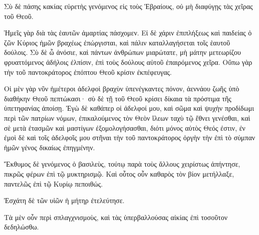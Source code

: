 {Σὺ δὲ πάσης κακίας εὑρετὴς γενόμενος εἰς τοὺς Ἑβραίους, οὐ μὴ διαφύγῃς τὰς χεῖρας τοῦ Θεοῦ.
\par }{\PP {}Ἡμεῖς γὰρ διὰ τὰς ἑαυτῶν ἁμαρτίας πάσχομεν.
Εἰ δὲ χάριν ἐπιπλήξεως καὶ παιδείας ὁ ζῶν Κύριος ἡμῶν βραχέως ἐπώργισται, καὶ πάλιν καταλλαγήσεται τοῖς ἑαυτοῦ δούλοις.
Σὺ δὲ ὦ ἀνόσιε, καὶ πάντων ἀνθρώπων μιαρώτατε, μὴ μάτην μετεωρίζου φρυαττόμενος ἀδήλοις ἐλπίσιν, ἐπὶ τοὺς δούλους αὐτοῦ ἐπαιρόμενος χεῖρα.
Οὔπω γὰρ τὴν τοῦ παντοκράτορος ἐπόπτου Θεοῦ κρίσιν ἐκπέφευγας.
\par }{\PP {}Οἱ μὲν γὰρ νῦν ἡμέτεροι ἀδελφοὶ βραχὺν ὑπενέγκαντες πόνον, ἀεννάου ζωῆς ὑπὸ διαθήκην Θεοῦ πεπτώκασι· σὺ δὲ τῇ τοῦ Θεοῦ κρίσει δίκαια τὰ πρόστιμα τῆς ὑπετηφανίας ἀποίσῃ.
Ἐγὼ δὲ καθάπερ οἱ ἀδελφοί μου, καὶ σῶμα καὶ ψυχὴν προδίδωμι περὶ τῶν πατρίων νόμων, ἐπικαλούμενος τὸν Θεὸν ἵλεων ταχὺ τῷ ἔθνει γενέσθαι, καὶ σὲ μετὰ ἐτασμῶν καὶ μαστίγων ἐξομολογήσασθαι, διότι μόνος αὐτὸς Θεός ἐστιν,
ἐν ἐμοὶ δὲ καὶ τοῖς ἀδελφοῖς μου στῆναι τὴν τοῦ παντοκράτορος ὀργὴν τὴν ἐπὶ τὸ σύμπαν ἡμῶν γένος δικαίως ἐπηγμένην.
\par }{\PP {}Ἔκθυμος δὲ γενόμενος ὁ βασιλεὺς, τούτῳ παρὰ τοὺς ἄλλους χειρίστως ἀπήντησε, πικρῶς φέρων ἐπὶ τῷ μυκτηρισμῷ.
Καὶ οὗτος οὖν καθαρὸς τὸν βίον μετήλλαξε, παντελῶς ἐπὶ τῷ Κυρίῳ πεποιθώς.
\par }{\PP {}Ἐσχάτη δὲ τῶν υἱῶν ἡ μήτηρ ἐτελεύτησε.
\par }{\PP {}Τὰ μὲν οὖν περὶ σπλαγχνισμοὺς, καὶ τὰς ὑπερβαλλούσας αἰκίας ἐπὶ τοσοῦτον δεδηλώσθω.

}
